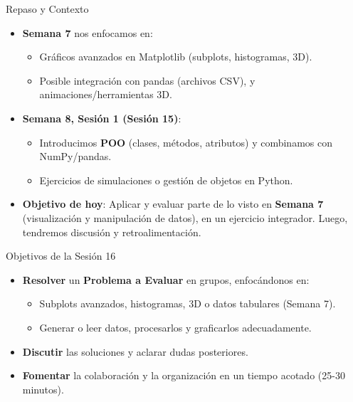 \documentclass[10pt]{beamer}
\begin{document}
\begin{frame}{Repaso y Contexto}
  \begin{itemize}
    \item \textbf{Semana 7} nos enfocamos en:
      \begin{itemize}
        \item Gráficos avanzados en Matplotlib (subplots, histogramas, 3D).
        \item Posible integración con pandas (archivos CSV), y animaciones/herramientas 3D.
      \end{itemize}
    \item \textbf{Semana 8, Sesión 1 (Sesión 15)}:
      \begin{itemize}
        \item Introducimos \textbf{POO} (clases, métodos, atributos) y combinamos con NumPy/pandas.
        \item Ejercicios de simulaciones o gestión de objetos en Python.
      \end{itemize}
    \item \textbf{Objetivo de hoy}: Aplicar y evaluar parte de lo visto en \textbf{Semana 7} (visualización y manipulación de datos), en un ejercicio integrador. Luego, tendremos discusión y retroalimentación.
  \end{itemize}
\end{frame}

\begin{frame}{Objetivos de la Sesión 16}
  \begin{itemize}
    \item \textbf{Resolver} un \textbf{Problema a Evaluar} en grupos, enfocándonos en:
      \begin{itemize}
        \item Subplots avanzados, histogramas, 3D o datos tabulares (Semana 7).
        \item Generar o leer datos, procesarlos y graficarlos adecuadamente.
      \end{itemize}
    \item \textbf{Discutir} las soluciones y aclarar dudas posteriores.
    \item \textbf{Fomentar} la colaboración y la organización en un tiempo acotado (25-30 minutos).
  \end{itemize}
\end{frame}
\end{document}
